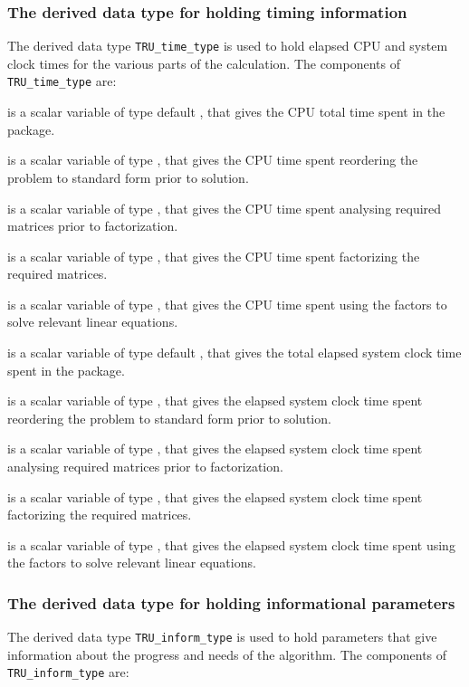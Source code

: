 \documentclass{galahad}
\newcommand{\packagename}{TRU}
\begin{document}
\subsubsection{The derived data type for holding timing
 information}\label{typetime}
The derived data type
{\tt \packagename\_time\_type}
is used to hold elapsed CPU and system clock times for the various parts
of the calculation. The components of
{\tt \packagename\_time\_type}
are:
\begin{description}
 is a scalar variable of type default \real, that gives
 the CPU total time spent in the package.

 is a scalar variable of type \realdp, that gives
 the CPU time spent reordering the problem to standard form prior to solution.

 is a scalar variable of type \realdp, that gives
 the CPU time spent analysing required matrices prior to factorization.

 is a scalar variable of type \realdp, that gives
 the CPU time spent factorizing the required matrices.

 is a scalar variable of type \realdp, that gives
 the CPU time spent using the factors to solve relevant linear equations.

 is a scalar variable of type default \real, that gives
 the total elapsed system clock time spent in the package.

 is a scalar variable of type \realdp, that gives
 the elapsed system clock time spent reordering the problem to standard form
prior to solution.

 is a scalar variable of type \realdp, that gives
 the  elapsed system clock time spent analysing required matrices prior to
factorization.

 is a scalar variable of type \realdp, that gives
 the  elapsed system clock time spent factorizing the required matrices.

 is a scalar variable of type \realdp, that gives
 the  elapsed system clock time spent using the factors to solve relevant
linear equations.

\end{description}


\subsubsection{The derived data type for holding informational
 parameters}\label{typeinform}
The derived data type
{\tt \packagename\_inform\_type}
is used to hold parameters that give information about the progress and needs
of the algorithm. The components of
{\tt \packagename\_inform\_type}
are:
\end{document}
